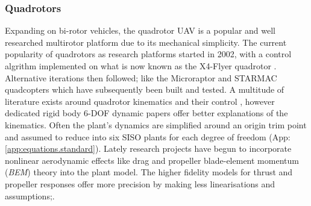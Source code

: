 \subsubsection*{Quadrotors}
Expanding on bi-rotor vehicles, the quadrotor UAV is a popular and well researched multirotor platform due to its mechanical simplicity. The current popularity of quadrotors as research platforms started in 2002, with a control algrithm implemented on what is now known as the X4-Flyer quadrotor \cite{x4flyer,x4flyercontrol}. Alternative iterations then followed; like the Microraptor\cite{microraptor} and STARMAC\cite{starmac} quadcopters which have subsequently been built and tested. A multitude of literature exists around quadrotor kinematics and their control \cite{dynamicmodelling2013, dynamicmodelling2009, modelingquadcopter, quaddynamics, fullquadcoptercontrol}, however dedicated rigid body 6-DOF dynamic papers \cite{rigidbodylecture,eulerrigidbody} offer better explanations of the kinematics. Often the plant's dynamics are simplified around an origin trim point and assumed to reduce into six SISO plants for each degree of freedom (App:\ref{app:equations.standard}). Lately research projects have begun to incorporate nonlinear aerodynamic effects like drag and propeller blade-element momentum (\emph{BEM}) theory into the plant model\cite{lowreynolds,bem,starmac}. The higher fidelity models for thrust and propeller responses offer more precision by making less linearisations and assumptions;\cite{nonlineardynamics,starmac}.
\par
